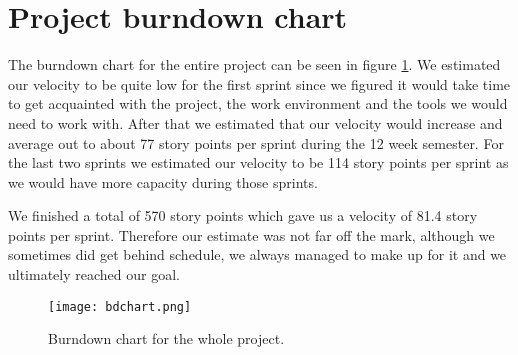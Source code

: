 \section{Project burndown chart}\label{sec:burndown}

The burndown chart for the entire project can be seen in figure \ref{fig:bdchart}. We estimated our velocity to be quite low for the first sprint since we figured it would take time to get acquainted with the project, the work environment and the tools we would need to work with. After that we estimated that our velocity would increase and average out to about 77 story points per sprint during the 12 week semester. For the last two sprints we estimated our velocity to be 114 story points per sprint as we would have more capacity during those sprints. 

We finished a total of 570 story points which gave us a velocity of 81.4 story points per sprint. Therefore our estimate was not far off the mark, although we sometimes did get behind schedule, we always managed to make up for it and we ultimately reached our goal. 
	
\begin{figure}[H]
  \centering
  \graphicspath{ {./graphics/} }
  \centerline{\texttt{[image: bdchart.png]}}
  \caption{\label{fig:bdchart} Burndown chart for the whole project.}
\end{figure}
